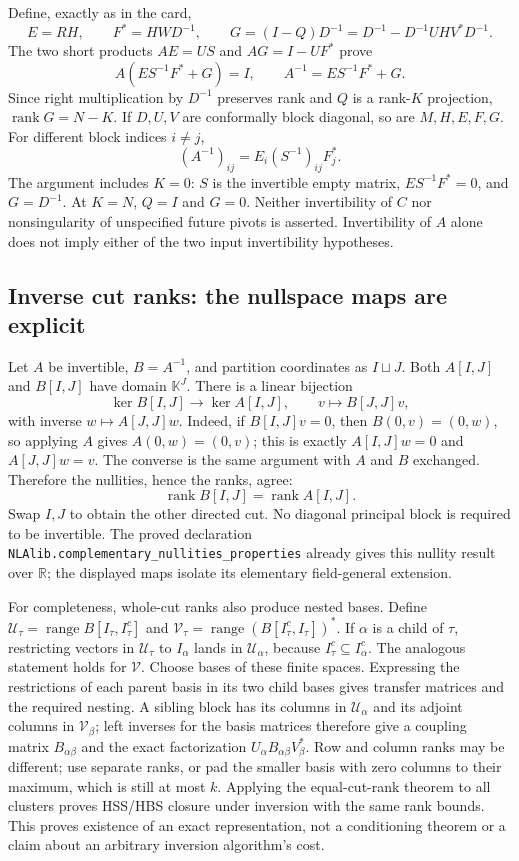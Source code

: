 \documentclass[11pt,a4paper]{article}
\newcommand{\R}{\mathbb R}
\DeclareMathOperator{\rank}{rank}
\DeclareRobustCommand{\code}[1]{{\footnotesize\urlstyle{tt}\nolinkurl{#1}}}
\begin{document}
Define, exactly as in the card,
\[
 E=RH,\qquad F^*=HWD^{-1},\qquad
 G=(I-Q)D^{-1}=D^{-1}-D^{-1}UHV^*D^{-1}.
\]
The two short products
$AE=US$ and $AG=I-UF^*$ prove
\[
 A(ES^{-1}F^*+G)=I,
 \qquad A^{-1}=ES^{-1}F^*+G.
\]
Since right multiplication by $D^{-1}$ preserves rank and $Q$ is a
rank-$K$ projection, $\rank G=N-K$. If $D,U,V$ are conformally block
diagonal, so are $M,H,E,F,G$. For different block indices $i\ne j$,
\[
 (A^{-1})_{ij}=E_i(S^{-1})_{ij}F_j^*.
\]
The argument includes $K=0$: $S$ is the invertible empty matrix,
$ES^{-1}F^*=0$, and $G=D^{-1}$. At $K=N$, $Q=I$ and $G=0$.
Neither invertibility of $C$ nor nonsingularity of unspecified future
pivots is asserted. Invertibility of $A$ alone does not imply either of
the two input invertibility hypotheses.

\subsection{Inverse cut ranks: the nullspace maps are explicit}

Let $A$ be invertible, $B=A^{-1}$, and partition coordinates as $I\sqcup J$.
Both $A[I,J]$ and $B[I,J]$ have domain $\mathbb K^J$. There is a linear
bijection
\[
 \ker B[I,J]\longrightarrow\ker A[I,J],\qquad
 v\longmapsto B[J,J]v,
\]
with inverse $w\mapsto A[J,J]w$. Indeed, if $B[I,J]v=0$, then
$B(0,v)=(0,w)$, so applying $A$ gives
$A(0,w)=(0,v)$; this is exactly
$A[I,J]w=0$ and $A[J,J]w=v$. The converse is the same argument with
$A$ and $B$ exchanged. Therefore the nullities, hence the ranks, agree:
\[
 \rank B[I,J]=\rank A[I,J].
\]
Swap $I,J$ to obtain the other directed cut. No diagonal principal block
is required to be invertible. The proved declaration
\code{NLAlib.complementary_nullities_properties} already gives this
nullity result over $\R$; the displayed maps isolate its elementary
field-general extension.

For completeness, whole-cut ranks also produce nested bases. Define
$\mathcal U_\tau=\operatorname{range}B[I_\tau,I_\tau^c]$ and
$\mathcal V_\tau=\operatorname{range}(B[I_\tau^c,I_\tau])^*$.
If $\alpha$ is a child of $\tau$, restricting vectors in
$\mathcal U_\tau$ to $I_\alpha$ lands in $\mathcal U_\alpha$, because
$I_\tau^c\subseteq I_\alpha^c$. The analogous statement holds for
$\mathcal V$. Choose bases of these finite spaces. Expressing the
restrictions of each parent basis in its two child bases gives transfer
matrices and the required nesting. A sibling block has its columns in
$\mathcal U_\alpha$ and its adjoint columns in $\mathcal V_\beta$;
left inverses for the basis matrices therefore give a coupling matrix
$B_{\alpha\beta}$ and the exact factorization
$U_\alpha B_{\alpha\beta}V_\beta^*$. Row and column ranks may be
different; use separate ranks, or pad the smaller basis with zero columns
to their maximum, which is still at most $k$.
Applying the equal-cut-rank theorem to all clusters proves HSS/HBS
closure under inversion with the same rank bounds. This proves
existence of an exact representation, not a conditioning theorem or a
claim about an arbitrary inversion algorithm's cost.
\end{document}
